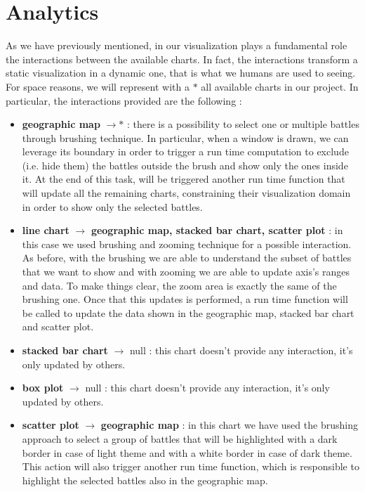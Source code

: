 \section{Analytics}
As we have previously mentioned, in our visualization plays a fundamental role the interactions between the available charts. In fact, the interactions transform a static visualization in a dynamic one, that is what we humans are used to seeing. For space reasons, we will represent with a $*$ all available charts in our project. In particular, the interactions provided are the following :
\begin{itemize}
\item \textbf{geographic map} $\rightarrow *$ : there is a possibility to select one or multiple battles through brushing technique. In particular, when a window is drawn, we can leverage its boundary in order to trigger a run time computation to exclude (i.e. hide them) the battles outside the brush and show only the ones inside it. At the end of this task, will be triggered another run time function that will update all the remaining charts, constraining their visualization domain in order to show only the selected battles.
\item \textbf{line chart} $\rightarrow$ \textbf{geographic map, stacked bar chart, scatter plot} : in this case we used brushing and zooming technique for a possible interaction. As before, with the brushing we are able to understand the subset of battles that we want to show and with zooming we are able to update axis's ranges and data. To make things clear, the zoom area is exactly the same of the brushing one. Once that this updates is performed, a run time function will be called to update the data shown in the geographic map, stacked bar chart and scatter plot.
\item \textbf{stacked bar chart} $\rightarrow$ null : this chart doesn't provide any interaction, it's only updated by others.
\item \textbf{box plot} $\rightarrow$ null : this chart doesn't provide any interaction, it's only updated by others.
\item \textbf{scatter plot} $\rightarrow$ \textbf{geographic map} : in this chart we have used the brushing approach to select a group of battles that will be highlighted with a dark border in case of light theme and with a white border in case of dark theme. This action will also trigger another run time function, which is responsible to highlight the selected battles also in the geographic map. 
\end{itemize}